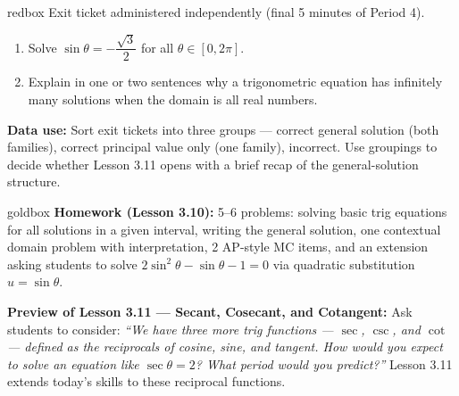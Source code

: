 \documentclass[10pt]{article}
\begin{document}
\vspace{0.08in}

\begin{skillbox}{redbox}
Exit ticket administered independently (final 5 minutes of Period 4).

\begin{enumerate}[leftmargin=1.4em, itemsep=4pt]
  \item Solve $\sin\theta = -\dfrac{\sqrt{3}}{2}$ for all $\theta \in [0, 2\pi]$.
  \item Explain in one or two sentences why a trigonometric equation has
    infinitely many solutions when the domain is all real numbers.
\end{enumerate}

\textbf{Data use:} Sort exit tickets into three groups --- correct general
solution (both families), correct principal value only (one family), incorrect.
Use groupings to decide whether Lesson 3.11 opens with a brief recap of the
general-solution structure.
\end{skillbox}

\vspace{0.08in}

\begin{skillbox}{goldbox}
\textbf{Homework (Lesson 3.10):} 5--6 problems: solving basic trig equations
for all solutions in a given interval, writing the general solution, one
contextual domain problem with interpretation, 2 AP-style MC items, and an
extension asking students to solve $2\sin^2\theta - \sin\theta - 1 = 0$ via
quadratic substitution $u = \sin\theta$.

\textbf{Preview of Lesson 3.11 --- Secant, Cosecant, and Cotangent:}
Ask students to consider: \textit{``We have three more trig functions ---
$\sec$, $\csc$, and $\cot$ --- defined as the reciprocals of cosine, sine,
and tangent. How would you expect to solve an equation like $\sec\theta = 2$?
What period would you predict?''} Lesson 3.11 extends today's skills to these
reciprocal functions.
\end{skillbox}
\end{document}
